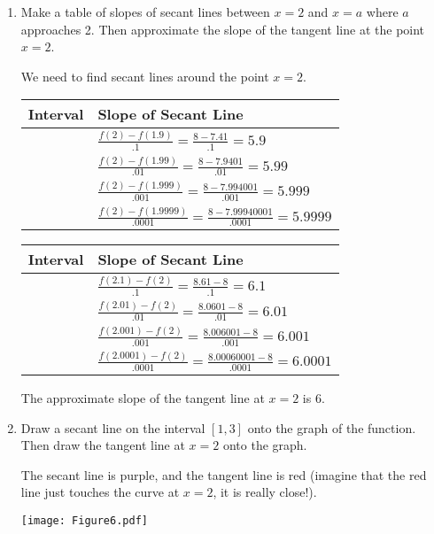 \documentclass[handout,nooutcomes]{ximera}
\begin{document}
\begin{problem}
\begin{enumerate}
		\item  Make a table of slopes of secant lines between $x=2$ and $x=a$ where $a$ approaches 2.  Then approximate the slope of the tangent line at the point $x=2$.
		\begin{freeResponse}		 
		We need to find secant lines around the point $x=2$.
		
			\begin{tabular}{|l|l|}
			\hline
			Interval & Slope of Secant Line  \\
			\hline
			[1.9,2] & $ \frac{f(2)-f(1.9)}{.1}=\frac{8-7.41}{.1}=5.9$  \\
			\hline
			[1.99,2] & $\frac{f(2)-f(1.99)}{.01}=\frac{8-7.9401}{.01}=5.99$  \\
			\hline
			[1.999,2] & $\frac{f(2)-f(1.999)}{.001}=\frac{8-7.994001}{.001}=5.999$  \\
			\hline
			[1.9999,2] & $\frac{f(2)-f(1.9999)}{.0001}=\frac{8-7.99940001}{.0001}=5.9999$  \\
			\hline
			\end{tabular}
			
			\begin{tabular}{|l|l|}
			\hline
			Interval & Slope of Secant Line  \\
			\hline
			[2,2.1] & $ \frac{f(2.1)-f(2)}{.1}=\frac{8.61-8}{.1}=6.1$  \\
			\hline
			[2,2.01] & $\frac{f(2.01)-f(2)}{.01}=\frac{8.0601-8}{.01}=6.01$  \\
			\hline
			[2,2.001] & $\frac{f(2.001)-f(2)}{.001}=\frac{8.006001-8}{.001}=6.001$  \\
			\hline
			[2,2.0001] & $\frac{f(2.0001)-f(2)}{.0001}=\frac{8.00060001-8}{.0001}=6.0001$  \\
			\hline
			\end{tabular}
			
		The approximate slope of the tangent line at $x=2$ is 6.
		\end{freeResponse}
			  
		\item  Draw a secant line on the interval $[1,3]$ onto the graph of the function.  Then draw the tangent line at $x=2$ onto the graph. 
		\begin{freeResponse}		 
		The secant line is purple, and the tangent line is red (imagine that the red line just touches the curve at $x=2$, it is really close!).
			\begin{image}
			\texttt{[image: Figure6.pdf]}
			\end{image}
		\end{freeResponse}
				
		\end{enumerate}
			
			
			

	
\end{problem}










								
				
\end{document}
